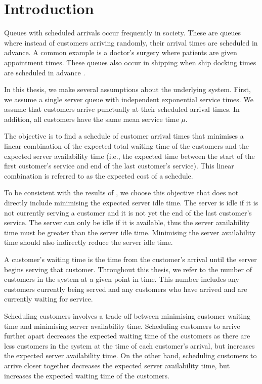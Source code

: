 \chapter{Introduction}
Queues with scheduled arrivals occur frequently in society. These are queues where instead of customers arriving randomly, their arrival times are scheduled in advance. A common example is a doctor's surgery where patients are given appointment times. These queues also occur in shipping when ship docking times are scheduled in advance \citep{Wang2}.

In this thesis, we make several assumptions about the underlying system. First, we assume a single server queue with independent exponential service times. We assume that customers arrive punctually at their scheduled arrival times. In addition, all customers have the same mean service time $\mu$.

The objective is to find a schedule of customer arrival times that minimises a linear combination of the expected total waiting time of the customers and the expected server availability time (i.e., the expected time between the start of the first customer's service and end of the last customer's service). This linear combination is referred to as the expected cost of a schedule.

To be consistent with the results of \citet{Pegden}, we choose this objective that does not directly include minimising the expected server idle time. The server is idle if it is not currently serving a customer and it is not yet the end of the last customer's service. The server can only be idle if it is available, thus the server availability time must be greater than the server idle time. Minimising the server availability time should also indirectly reduce the server idle time.

A customer's waiting time is the time from the customer's arrival until the server begins serving that customer. Throughout this thesis, we refer to the number of customers in the system at a given point in time. This number includes any customers currently being served and any customers who have arrived and are currently waiting for service.

Scheduling customers involves a trade off between minimising customer waiting time and minimising server availability time. Scheduling customers to arrive further apart decreases the expected waiting time of the customers as there are less customers in the system at the time of each customer's arrival, but increases the expected server availability time. On the other hand, scheduling customers to arrive closer together decreases the expected server availability time, but increases the expected waiting time of the customers.

